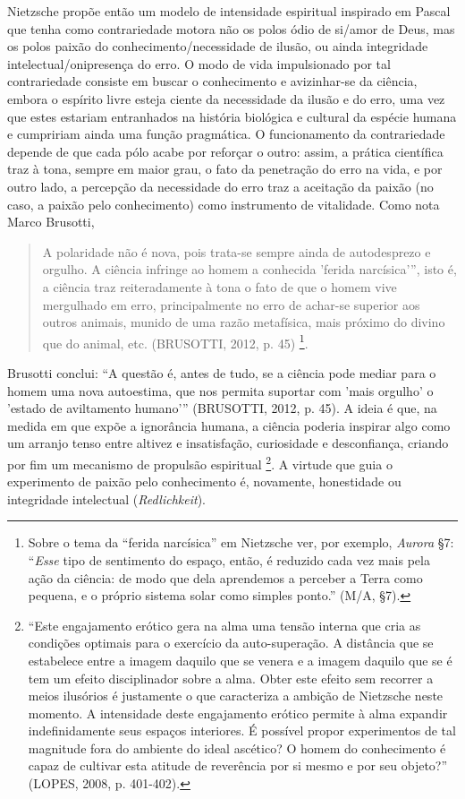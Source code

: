 \documentclass[
	12pt,				%
	openright,			%
	oneside,			%
	a4paper,			%
	english,			%
	french,				%
	spanish,			%
	brazil				%
	]{abntex2}
\begin{document}
Nietzsche propõe então um modelo de intensidade espiritual inspirado em Pascal que tenha como contrariedade motora não os polos ódio de si/amor de Deus, mas os polos paixão do conhecimento/necessidade de ilusão, ou ainda integridade intelectual/onipresença do erro. O modo de vida impulsionado por tal contrariedade consiste em buscar o conhecimento e avizinhar-se da ciência, embora o espírito livre esteja ciente da necessidade da ilusão e do erro, uma vez que estes estariam entranhados na história biológica e cultural da espécie humana e cumpririam ainda uma função pragmática. O funcionamento da contrariedade depende de que cada pólo acabe por reforçar o outro: assim, a prática científica traz à tona, sempre em maior grau, o fato da penetração do erro na vida, e por outro lado, a percepção da necessidade do erro traz a aceitação da paixão (no caso, a paixão pelo conhecimento) como instrumento de vitalidade. Como nota Marco Brusotti, 

\begin{quotation}
A polaridade não é nova, pois trata-se sempre ainda de autodesprezo e orgulho. A ciência infringe ao homem a conhecida 'ferida narcísica'”, isto é, a ciência traz reiteradamente à tona o fato de que o homem vive mergulhado em erro, principalmente no erro de achar-se superior aos outros animais, munido de uma razão metafísica, mais próximo do divino que do animal, etc. (BRUSOTTI, 2012, p. 45)
\footnote{Sobre o tema da “ferida narcísica” em Nietzsche ver, por exemplo, \textit{Aurora} §7: “\textit{Esse} tipo de sentimento do espaço, então, é reduzido cada vez mais pela ação da ciência: de modo que dela aprendemos a perceber a Terra como pequena, e o próprio sistema solar como simples ponto.” (M/A, §7).}.
\end{quotation}

Brusotti conclui: “A questão é, antes de tudo, se a ciência pode mediar para o homem uma nova autoestima, que nos permita suportar com 'mais orgulho' o 'estado de aviltamento humano'” (BRUSOTTI, 2012, p. 45). A ideia é que, na medida em que expõe a ignorância humana, a ciência poderia inspirar algo como um arranjo tenso entre altivez e insatisfação, curiosidade e desconfiança, criando por fim um mecanismo de propulsão espiritual
\footnote{“Este engajamento erótico gera na alma uma tensão interna que cria as condições optimais para o exercício da auto-superação. A distância que se estabelece entre a imagem daquilo que se venera e a imagem daquilo que se é tem um efeito disciplinador sobre a alma. Obter este efeito sem recorrer a meios ilusórios é justamente o que caracteriza a ambição de Nietzsche neste momento. A intensidade deste engajamento erótico permite à alma expandir indefinidamente seus espaços interiores. É possível propor experimentos de tal magnitude fora do ambiente do ideal ascético? O homem do conhecimento é capaz de cultivar esta atitude de reverência por si mesmo e por seu objeto?” (LOPES, 2008, p. 401-402).}. 
A virtude que guia o experimento de paixão pelo conhecimento é, novamente, honestidade ou integridade intelectual (\textit{Redlichkeit}).
\end{document}
